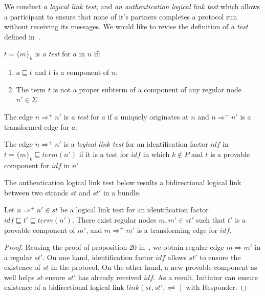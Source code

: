 We conduct \emph{a logical link test}, and \emph{an authentication logical link test} which allows a participant to ensure that none of it's partners completes a protocol run without receiving its messages. We would like to revise the definition of \emph{a test} defined in~\cite{authenticationtests}. 

\begin{Definition}[A test] 
$t = \{m\}_k$ is \emph{a test} for $a$ in $n$ if:
\begin{enumerate}
\item $a\sqsubseteq t$ and $t$ is a component of $n$;
\item The term $t$ is not a proper subterm of a component of any regular node $n' \in \Sigma$. 
\end{enumerate}
The edge $n \Rightarrow^+ n'$ is \emph{a test} for $a$ if $a$ uniquely originates at $n$ and $n \Rightarrow^+ n'$ is a transformed edge for $a$. 
\end{Definition}

\begin{Definition} The edge $n \Rightarrow^+ n'$ is a \emph{logical link test} for an identification factor $idf$ in $t = \{m\}_k \sqsubseteq term(n')$ if it is a test for $idf$ in which $k \not\in P$ and $t$ is a provable component for $idf$ in $n'$
\end{Definition}

The authentication logical link test below results a bidirectional logical link between two strands $st$ and $st'$ in a bundle. 
\begin{Proposition}\label{logicaltest}Let $n \Rightarrow^+ n' \in st$ be a logical link test for an identification factor $idf \sqsubseteq t' \sqsubseteq term(n')$. There exist regular nodes $m, m' \in st'$ such that $t'$ is a provable component of $m'$, and $m \Rightarrow^+ m'$ is a transforming edge for $idf$. 
\end{Proposition}

\begin{proof}
Reusing the proof of proposition 20 in~\cite{Guttman:2002:ATS:568264.568267}, we obtain regular edge $m \Rightarrow m'$ in a regular $st'$. On one hand, identification factor $idf$ allows $st'$ to ensure the existence of $st$ in the protocol. On the other hand, a new provable component as well helps $st$ ensure $st'$ has already received $idf$. As a result, Initiator can ensure existence of a bidirectional logical link $link(st,st',\rightleftharpoons)$ with Responder. 
\end{proof}

